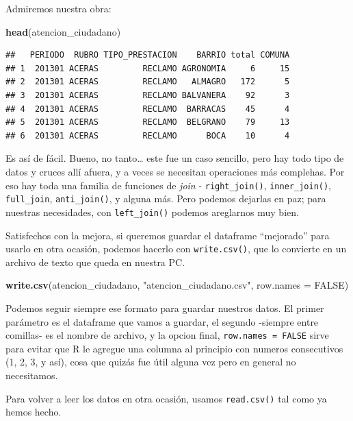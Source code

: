 \documentclass[]{book}
\newenvironment{Shaded}{\begin{snugshade}}{\end{snugshade}}
\newcommand{\KeywordTok}[1]{\textcolor[rgb]{0.13,0.29,0.53}{\textbf{#1}}}
\newcommand{\DataTypeTok}[1]{\textcolor[rgb]{0.13,0.29,0.53}{#1}}
\newcommand{\StringTok}[1]{\textcolor[rgb]{0.31,0.60,0.02}{#1}}
\newcommand{\OtherTok}[1]{\textcolor[rgb]{0.56,0.35,0.01}{#1}}
\newcommand{\NormalTok}[1]{#1}
\begin{document}
Admiremos nuestra obra:

\begin{Shaded}
\begin{Highlighting}[]
\KeywordTok{head}\NormalTok{(atencion_ciudadano)}
\end{Highlighting}
\end{Shaded}

\begin{verbatim}
##   PERIODO  RUBRO TIPO_PRESTACION    BARRIO total COMUNA
## 1  201301 ACERAS         RECLAMO AGRONOMIA     6     15
## 2  201301 ACERAS         RECLAMO   ALMAGRO   172      5
## 3  201301 ACERAS         RECLAMO BALVANERA    92      3
## 4  201301 ACERAS         RECLAMO  BARRACAS    45      4
## 5  201301 ACERAS         RECLAMO  BELGRANO    79     13
## 6  201301 ACERAS         RECLAMO      BOCA    10      4
\end{verbatim}

Es así de fácil. Bueno, no tanto\ldots{} este fue un caso sencillo, pero
hay todo tipo de datos y cruces allí afuera, y a veces se necesitan
operaciones más complehas. Por eso hay toda una familia de funciones de
\emph{join} - \texttt{right\_join()}, \texttt{inner\_join()},
\texttt{full\_join}, \texttt{anti\_join()}, y alguna más. Pero podemos
dejarlas en paz; para nuestras necesidades, con \texttt{left\_join()}
podemos areglarnos muy bien.

Satisfechos con la mejora, si queremos guardar el dataframe ``mejorado''
para usarlo en otra ocasión, podemos hacerlo con \texttt{write.csv()},
que lo convierte en un archivo de texto que queda en nuestra PC.

\begin{Shaded}
\begin{Highlighting}[]
\KeywordTok{write.csv}\NormalTok{(atencion_ciudadano, }\StringTok{"atencion_ciudadano.csv"}\NormalTok{, }\DataTypeTok{row.names =} \OtherTok{FALSE}\NormalTok{)}
\end{Highlighting}
\end{Shaded}

Podemos seguir siempre ese formato para guardar nuestros datos. El
primer parámetro es el dataframe que vamos a guardar, el segundo
-siempre entre comillas- es el nombre de archivo, y la opcion final,
\texttt{row.names\ =\ FALSE} sirve para evitar que R le agregue una
columna al principio con numeros consecutivos (1, 2, 3, y así), cosa que
quizás fue útil alguna vez pero en general no necesitamos.

Para volver a leer los datos en otra ocasión, usamos \texttt{read.csv()}
tal como ya hemos hecho.
\end{document}
